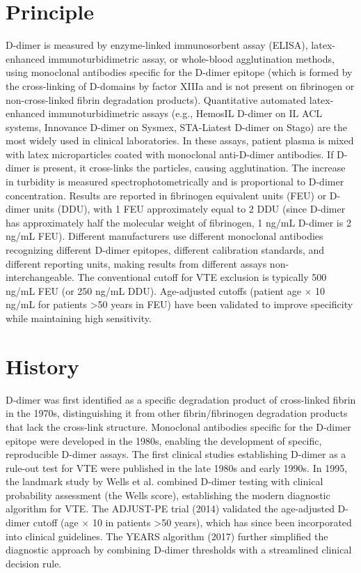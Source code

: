 \section*{Principle}
D-dimer is measured by enzyme-linked immunosorbent assay (ELISA), latex-enhanced immunoturbidimetric assay, or whole-blood agglutination methods, using monoclonal antibodies specific for the D-dimer epitope (which is formed by the cross-linking of D-domains by factor XIIIa and is not present on fibrinogen or non-cross-linked fibrin degradation products). Quantitative automated latex-enhanced immunoturbidimetric assays (e.g., HemosIL D-dimer on IL ACL systems, Innovance D-dimer on Sysmex, STA-Liatest D-dimer on Stago) are the most widely used in clinical laboratories. In these assays, patient plasma is mixed with latex microparticles coated with monoclonal anti-D-dimer antibodies. If D-dimer is present, it cross-links the particles, causing agglutination. The increase in turbidity is measured spectrophotometrically and is proportional to D-dimer concentration. Results are reported in fibrinogen equivalent units (FEU) or D-dimer units (DDU), with 1 FEU approximately equal to 2 DDU (since D-dimer has approximately half the molecular weight of fibrinogen, 1 ng/mL D-dimer is 2 ng/mL FEU). Different manufacturers use different monoclonal antibodies recognizing different D-dimer epitopes, different calibration standards, and different reporting units, making results from different assays non-interchangeable. The conventional cutoff for VTE exclusion is typically 500 ng/mL FEU (or 250 ng/mL DDU). Age-adjusted cutoffs (patient age $\times$ 10 ng/mL for patients >50 years in FEU) have been validated to improve specificity while maintaining high sensitivity.

\section*{History}
D-dimer was first identified as a specific degradation product of cross-linked fibrin in the 1970s, distinguishing it from other fibrin/fibrinogen degradation products that lack the cross-link structure. Monoclonal antibodies specific for the D-dimer epitope were developed in the 1980s, enabling the development of specific, reproducible D-dimer assays. The first clinical studies establishing D-dimer as a rule-out test for VTE were published in the late 1980s and early 1990s. In 1995, the landmark study by Wells et al. combined D-dimer testing with clinical probability assessment (the Wells score), establishing the modern diagnostic algorithm for VTE. The ADJUST-PE trial (2014) validated the age-adjusted D-dimer cutoff (age $\times$ 10 in patients >50 years), which has since been incorporated into clinical guidelines. The YEARS algorithm (2017) further simplified the diagnostic approach by combining D-dimer thresholds with a streamlined clinical decision rule.

